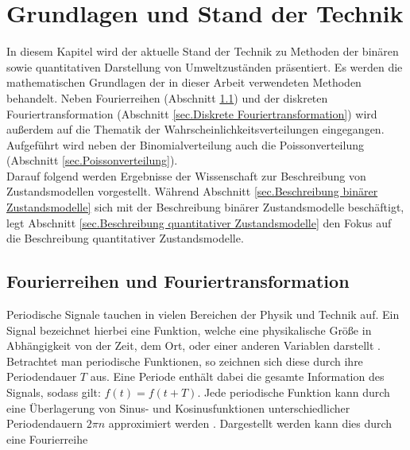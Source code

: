 \chapter{Grundlagen und Stand der Technik}
\label{sec.Grundlagen und Stand der Technik}

In diesem Kapitel wird der aktuelle Stand der Technik zu Methoden der binären sowie quantitativen Darstellung von Umweltzuständen präsentiert. Es werden die mathematischen Grundlagen der in dieser Arbeit verwendeten Methoden behandelt. Neben Fourierreihen (Abschnitt \ref{sec.Fourierreihen und Fouriertransformation}) und der diskreten Fouriertransformation (Abschnitt \ref{sec.Diskrete Fouriertransformation}) wird  außerdem auf die Thematik der Wahrscheinlichkeitsverteilungen eingegangen. Aufgeführt wird neben der Binomialverteilung auch die Poissonverteilung (Abschnitt \ref{sec.Poissonverteilung}). \\
Darauf folgend werden Ergebnisse der Wissenschaft zur Beschreibung von Zustandsmodellen vorgestellt. Während Abschnitt \ref{sec.Beschreibung binärer Zustandsmodelle} sich mit der Beschreibung binärer Zustandsmodelle beschäftigt, legt Abschnitt \ref{sec.Beschreibung quantitativer Zustandsmodelle} den Fokus auf die Beschreibung quantitativer Zustandsmodelle. 

\section{Fourierreihen und Fouriertransformation}
\label{sec.Fourierreihen und Fouriertransformation}
Periodische Signale tauchen in vielen Bereichen der Physik und Technik auf. Ein Signal bezeichnet hierbei eine Funktion, welche eine physikalische Größe in Abhängigkeit von der Zeit, dem Ort, oder einer anderen Variablen darstellt \cite{Eichler.2006}. Betrachtet man periodische Funktionen, so zeichnen sich diese durch ihre Periodendauer $T$ aus. Eine Periode enthält dabei die gesamte Information des Signals, sodass gilt: $f(t) = f(t+T)$. Jede periodische Funktion kann durch eine Überlagerung von Sinus- und Kosinusfunktionen unterschiedlicher Periodendauern $2 \pi n$ approximiert werden \cite{Eichler.2006}. Dargestellt werden kann dies durch eine Fourierreihe 

